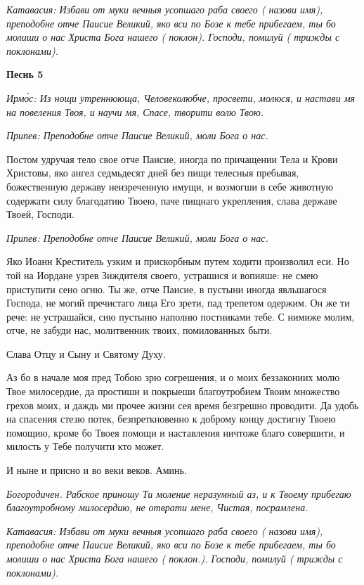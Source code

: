 \itshape Катавасия:\normalfont{} Избави от муки вечныя усопшаго раба своего ( \itshape назови имя\normalfont{}), преподобне отче Паисие Великий, яко вси по Бозе к тебе прибегаем, ты бо молиши о нас Христа Бога нашего ( \itshape поклон\normalfont{}). Господи, помилуй ( \itshape трижды с поклонами\normalfont{}).





\bfseries Песнь 5\normalfont{}


\itshape Ирмо́с:\normalfont{} Из нощи утреннююща, Человеколюбче, просвети, молюся, и настави мя на повеления Твоя, и научи мя, Спасе, творити волю Твою.


\itshape Припев:\normalfont{} Преподобне отче Паисие Великий, моли Бога о нас.


Постом удручая тело свое отче Паисие, иногда по причащении Тела и Крови Христовы, яко ангел седмьдесят дней без пищи телесныя пребывая, божественную державу неизреченную имущи, и возмогши в себе животную содержати силу благодатию Твоею, паче пищнаго укрепления, слава державе Твоей, Господи.


\itshape Припев:\normalfont{} Преподобне отче Паисие Великий, моли Бога о нас.


Яко Иоанн Креститель узким и прискорбным путем ходити произволил еси. Но той на Иордане узрев Зиждителя своего, устрашися и вопияше: не смею приступити сено огню. Ты же, отче Паисие, в пустыни иногда явльшагося Господа, не могий пречистаго лица Его зрети, пад трепетом одержим. Он же ти рече: не устрашайся, сию пустыню наполню постниками тебе. С нимиже молим, отче, не забуди нас, молитвенник твоих, помилованных быти.


Слава Отцу и Сыну и Святому Духу.


Аз бо в начале моя пред Тобою зрю согрешения, и о моих беззакониих молю Твое милосердие, да простиши и покрыеши благоутробием Твоим множество грехов моих, и даждь ми прочее жизни сея время безгрешно проводити. Да удобь на спасения стезю потек, безпреткновенно к доброму концу достигну Твоею помощию, кроме бо Твоея помощи и наставления ничтоже благо совершити, и милость у Тебе получити кто может.


И ныне и присно и во веки веков. Аминь.


\itshape Богородичен.\normalfont{} Рабское приношу Ти моление неразумный аз, и к Твоему прибегаю благоутробному милосердию, не отврати мене, Чистая, посрамлена.


\itshape Катавасия:\normalfont{} Избави от муки вечныя усопшаго раба своего ( \itshape назови имя\normalfont{}), преподобне отче Паисие Великий, яко вси по Бозе к тебе прибегаем, ты бо молиши о нас Христа Бога нашего ( \itshape поклон.\normalfont{}). Господи, помилуй ( \itshape трижды с поклонами\normalfont{}).






